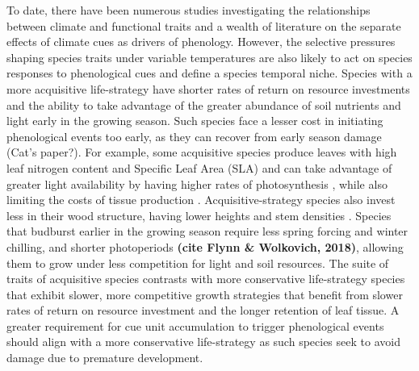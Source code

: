 \documentclass{article}\usepackage[]{graphicx}\usepackage[]{color}
\begin{document}

To date, there have been numerous studies investigating the relationships between climate and functional traits and a wealth of literature on the separate effects of climate cues as drivers of phenology. However, the selective pressures shaping species traits under variable temperatures are also likely to act on species responses to phenological cues and define a species temporal niche. Species with a more acquisitive life-strategy have shorter rates of return on resource investments and the ability to take advantage of the greater abundance of soil nutrients and light early in the growing season. Such species face a lesser cost in initiating phenological events too early, as they can recover from early season damage (Cat's paper?). For example, some acquisitive species produce leaves with high leaf nitrogen content and Specific Leaf Area (SLA) and can take advantage of greater light availability by having higher rates of photosynthesis \citep{Wright2004,Pereira2020}, while also limiting the costs of tissue production \citep{Lambers2004, Westoby2006, Herault2011}. Acquisitive-strategy species also invest less in their wood structure, having lower heights and stem densities \citep{Laughlin2010}. Species that budburst earlier in the growing season require less spring forcing and winter chilling, and shorter photoperiods \textbf{(cite Flynn \& Wolkovich, 2018)}, allowing them to grow under less competition for light and soil resources. The suite of traits of acquisitive species contrasts with more conservative life-strategy species that exhibit slower, more competitive growth strategies that benefit from slower rates of return on resource investment and the longer retention of leaf tissue. A greater requirement for cue unit accumulation to trigger phenological events should align with a more conservative life-strategy as such species seek to avoid damage due to premature development.      
 
   
\end{document}
